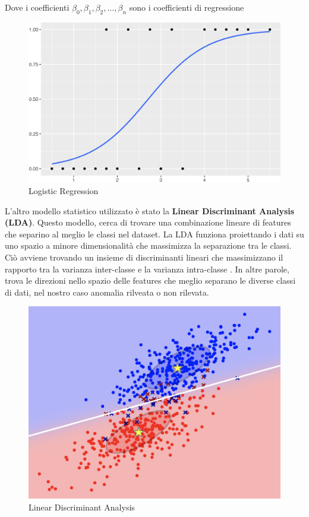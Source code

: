 Dove i coefficienti $\beta_0, \beta_1, \beta_2, \ldots, \beta_n$ sono i coefficienti di regressione

\begin{figure}[H]
    \centering
    \includegraphics[width=0.6\linewidth]{Logistic Regression.png}
    \caption{Logistic Regression}
    \label{fig:logistic_regression}
\end{figure}

\vspace{1.5cm}

L'altro modello statistico utilizzato \`e stato la \textbf{Linear Discriminant Analysis (LDA)}. Questo modello, cerca di trovare una combinazione lineare di features che separino al meglio le classi nel dataset. La LDA funziona proiettando i dati su uno spazio a minore  dimensionalit\`a che massimizza la separazione tra le classi. Ci\`o avviene trovando un insieme di discriminanti lineari che massimizzano il rapporto tra la varianza inter-classe e la varianza intra-classe \cite{lda}. In altre parole, trova le direzioni nello spazio delle features che meglio separano le diverse classi di dati, nel nostro caso anomalia rilveata o non rilevata.

\begin{figure}[H]
    \centering
    \includegraphics[width=0.5\linewidth]{LDA2.png}
    \caption{Linear Discriminant Analysis}
    \label{fig:lda}
\end{figure}

